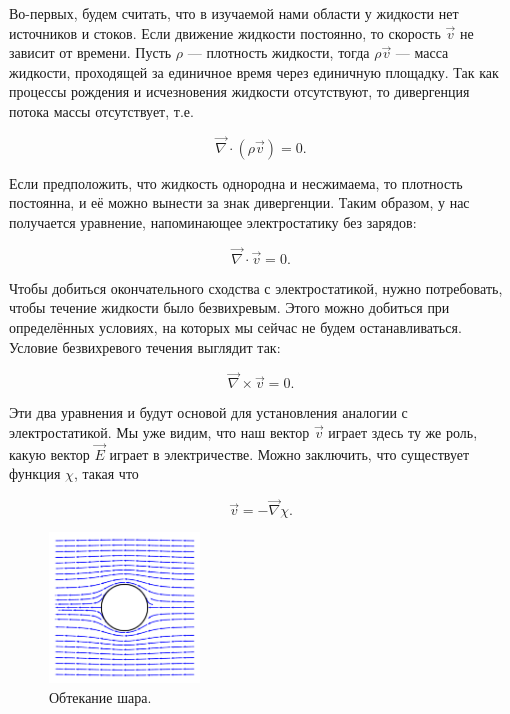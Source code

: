 \documentclass[12pt,a4paper]{article}
\numberwithin{equation}{section}
\numberwithin{equation}{section}
\newcommand{\vn}{\vec{\nabla}}
\begin{document}
Во-первых, будем считать, что в изучаемой нами области у жидкости нет
источников и стоков. Если движение жидкости постоянно, то скорость
$\vec{v}$ не зависит от времени. Пусть $\rho$ --- плотность жидкости,
тогда $\rho \vec{v}$ --- масса жидкости, проходящей за единичное время
через единичную площадку. Так как процессы рождения и исчезновения
жидкости отсутствуют, то дивергенция потока массы отсутствует, т.е.

\begin{equation}
  \label{eq:hydro_1}
  \vn \cdot (\rho \vec{v}) =0.
\end{equation}

Если предположить, что жидкость однородна и несжимаема, то плотность
постоянна, и её можно вынести за знак дивергенции. Таким образом, у
нас получается уравнение, напоминающее электростатику без зарядов: 

\begin{equation}
  \label{eq:hydro_2}
  \vn \cdot \vec{v} = 0.
\end{equation}

Чтобы добиться окончательного сходства с электростатикой, нужно
потребовать, чтобы течение жидкости было безвихревым. Этого можно
добиться при определённых условиях, на которых мы сейчас не будем
останавливаться. Условие безвихревого течения выглядит так: 

\begin{equation}
  \label{eq:hydro_3}
  \vn \times \vec{v} = 0.
\end{equation}

Эти два уравнения и будут основой для установления аналогии с
электростатикой. Мы уже видим, что наш вектор $\vec{v}$ играет здесь
ту же роль, какую вектор $\vec{E}$ играет в электричестве. Можно
заключить, что существует функция $\chi$, такая что

\begin{equation}
  \label{eq:hydro_4}
  \vec{v} = - \vn \chi.
\end{equation}


\begin{figure}
  \vspace{-1cm}
  \begin{center}
    \includegraphics[width=4cm,height=4cm]{fluid_lines.pdf}
  \end{center}
  \vspace{-0.7cm}
  \caption{Обтекание шара.}
  \label{fig:hydro}
\end{figure}
\end{document}

